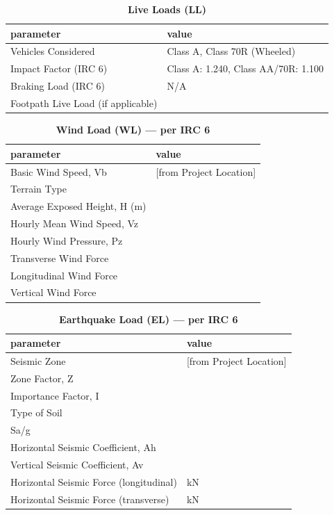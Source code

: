 \documentclass[12pt,a4paper]{report}
\numberwithin{table}{chapter}
\numberwithin{figure}{chapter}
\begin{document}
\vspace{1em}
\begin{longtable}{|L{5.5cm}|p{10.0cm}|}
\caption{\textbf{Live Loads (LL)}}\\
\hline
\textbf{parameter} & \textbf{value} \\
\hline
\textnormal{Vehicles Considered} & Class A, Class 70R (Wheeled) \\[6pt]
\hline
\textnormal{Impact Factor (IRC 6)} & Class A:\allowbreak{} 1.240, Class AA/70R:\allowbreak{} 1.100 \\[6pt]
\hline
\textnormal{Braking Load (IRC 6)} & N/A \\[6pt]
\hline
\textnormal{Footpath Live Load (if applicable)} &  \\[6pt]
\hline
\end{longtable}

\vspace{1em}
\begin{longtable}{|L{5.5cm}|p{10.0cm}|}
\caption{\textbf{Wind Load (WL) --- per IRC 6}}\\
\hline
\textbf{parameter} & \textbf{value} \\
\hline
\textnormal{Basic Wind Speed, Vb} &  [from Project Location] \\[6pt]
\hline
\textnormal{Terrain Type} &  \\[6pt]
\hline
\textnormal{Average Exposed Height, H (m)} &  \\[6pt]
\hline
\textnormal{Hourly Mean Wind Speed, Vz} &  \\[6pt]
\hline
\textnormal{Hourly Wind Pressure, Pz} &  \\[6pt]
\hline
\textnormal{Transverse Wind Force} &  \\[6pt]
\hline
\textnormal{Longitudinal Wind Force} &  \\[6pt]
\hline
\textnormal{Vertical Wind Force} &  \\[6pt]
\hline
\end{longtable}

\vspace{1em}
\begin{longtable}{|L{5.5cm}|p{10.0cm}|}
\caption{\textbf{Earthquake Load (EL) --- per IRC 6}}\\
\hline
\textbf{parameter} & \textbf{value} \\
\hline
\textnormal{Seismic Zone} &  [from Project Location] \\[6pt]
\hline
\textnormal{Zone Factor, Z} &  \\[6pt]
\hline
\textnormal{Importance Factor, I} &  \\[6pt]
\hline
\textnormal{Type of Soil} &  \\[6pt]
\hline
\textnormal{Sa/g} &  \\[6pt]
\hline
\textnormal{Horizontal Seismic Coefficient, Ah} &  \\[6pt]
\hline
\textnormal{Vertical Seismic Coefficient, Av} &  \\[6pt]
\hline
\textnormal{Horizontal Seismic Force (longitudinal)} &  kN \\[6pt]
\hline
\textnormal{Horizontal Seismic Force (transverse)} &  kN \\[6pt]
\hline
\end{longtable}
\end{document}
